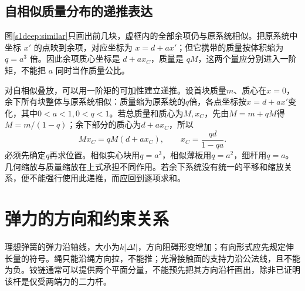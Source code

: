 \subsection{自相似质量分布的递推表达}
图\ref{s1deep:similar}只画出前几块，虚框内的全部余项仍与原系统相似。把原系统中坐标 $x'$ 的点映到余项，对应坐标为 $x=d+ax'$；但它携带的质量按体积缩为 $q=a^3$ 倍。因此余项质心坐标是 $d+ax_C$，质量是 $qM$，这两个量应分别进入一阶矩，不能把 $a$ 同时当作质量公比。

对自相似叠放，可以用一阶矩的可加性建立递推。设首块质量$m$、质心在$x=0$，余下所有块整体与原系统相似：质量缩为原系统的$q$倍，各点坐标按$x=d+ax'$变化，其中$0<a<1,0<q<1$。若总质量和质心为$M,x_C$，先由$M=m+qM$得$M=m/(1-q)$；余下部分的质心为$d+ax_C$，所以
\[
Mx_C=qM(d+ax_C),\qquad
x_C=\frac{qd}{1-qa}.
\]
必须先确定$q$再求位置。相似实心块用$q=a^3$，相似薄板用$q=a^2$，细杆用$q=a$。几何缩放与质量缩放在上式承担不同作用。若余下系统没有统一的平移和缩放关系，便不能强行使用此递推，而应回到逐项求和。

\section{弹力的方向和约束关系}
理想弹簧的弹力沿轴线，大小为$k|\Delta l|$，方向阻碍形变增加；有向形式应先规定伸长量的符号。绳只能沿绳方向拉，不能推；光滑接触面的支持力沿公法线，且不能为负。铰链通常可以提供两个平面分量，不能预先把其方向沿杆画出，除非已证明该杆是仅受两端力的二力杆。

